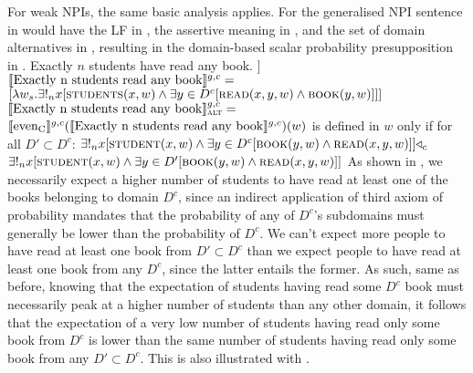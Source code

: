 For weak NPIs, the same basic analysis applies. For the generalised NPI sentence in  would have the LF in , the assertive meaning in , and the set of domain alternatives in , resulting in the domain-based scalar probability presupposition in .
\pex[nopreamble=true]%
\a{} Exactly $n$ students have read any book.
\a[]\phantomsection [even\textsubscript{C} [exactly $n$ students read any book]]
\a{} $\intension[g,c]{Exactly n students read any book}=$\\\emptyfill$[\lambda{w_s}.\exists!_n{x}[\predicate{students}(x,w)\land\exists{y\in{D}^c}[\predicate{read}(x,y,w)\land\predicate{book}(y,w)]]]$
\a{} $\intension[g,c]{Exactly n students read any book}_{\text{\scshape alt}}=$\\\emptyfill{}
\xe
\ex{}
$\intension[g,c]{even\textsubscript{C}}(\intension[g,c]{Exactly n students read any book})(w)$ is defined in $w$ only if for all $D'\subset D^c$: $\exists!_n{x}[\predicate{student}(x,w)\land\exists{y\in{D^c}}[\predicate{book}(y,w)\land\predicate{read}(x,y,w)]]\lprob_c$\\\emptyfill$\exists!_n{x}[\predicate{student}(x,w)\land\exists{y\in{D'}}[\predicate{book}(y,w)\land\predicate{read}(x,y,w)]]$
\xe
As shown in , we necessarily expect a higher number of students to have read at least one of the books belonging to domain $D^c$, since an indirect application of  third axiom of probability mandates that the probability of any of $D^c$'s subdomains must generally be lower than the probability of $D^c$.  We can't expect more people to have read at least one book from $D'\subset D^c$ than we expect people to have read at least one book from any $D^c$, since the latter entails the former. As such, same as before, knowing that the expectation of students having read some $D^c$ book must necessarily peak at a higher number of students than any other domain, it follows that the expectation of a very low number of students having read only some book from $D^c$ is lower than the same number of students having read only some book from any $D'\subset D^c$. This is also illustrated with .
